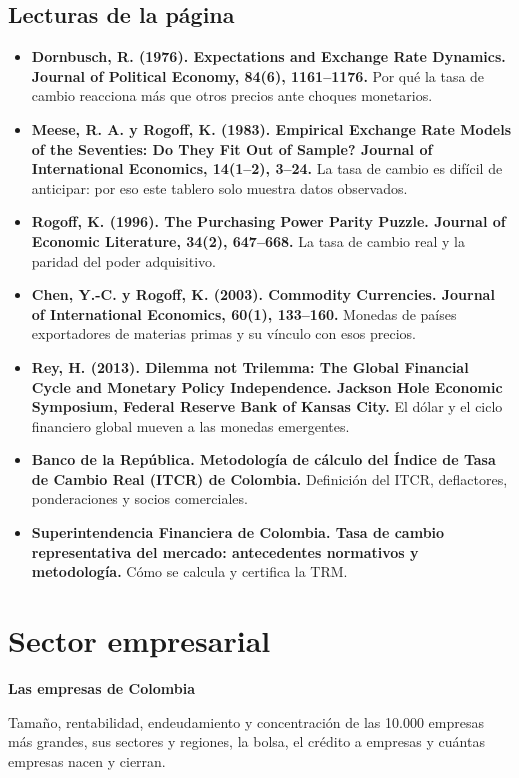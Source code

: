 \section*{Lecturas de la página}
\begin{itemize}\small
\item \textbf{Dornbusch, R. (1976). Expectations and Exchange Rate Dynamics. Journal of Political Economy, 84(6), 1161–1176.} Por qué la tasa de cambio reacciona más que otros precios ante choques monetarios.
\item \textbf{Meese, R. A. y Rogoff, K. (1983). Empirical Exchange Rate Models of the Seventies: Do They Fit Out of Sample? Journal of International Economics, 14(1–2), 3–24.} La tasa de cambio es difícil de anticipar: por eso este tablero solo muestra datos observados.
\item \textbf{Rogoff, K. (1996). The Purchasing Power Parity Puzzle. Journal of Economic Literature, 34(2), 647–668.} La tasa de cambio real y la paridad del poder adquisitivo.
\item \textbf{Chen, Y.-C. y Rogoff, K. (2003). Commodity Currencies. Journal of International Economics, 60(1), 133–160.} Monedas de países exportadores de materias primas y su vínculo con esos precios.
\item \textbf{Rey, H. (2013). Dilemma not Trilemma: The Global Financial Cycle and Monetary Policy Independence. Jackson Hole Economic Symposium, Federal Reserve Bank of Kansas City.} El dólar y el ciclo financiero global mueven a las monedas emergentes.
\item \textbf{Banco de la República. Metodología de cálculo del Índice de Tasa de Cambio Real (ITCR) de Colombia.} Definición del ITCR, deflactores, ponderaciones y socios comerciales.
\item \textbf{Superintendencia Financiera de Colombia. Tasa de cambio representativa del mercado: antecedentes normativos y metodología.} Cómo se calcula y certifica la TRM.
\end{itemize}

\chapter{Sector empresarial}
\label{atlas:empresas}

{\large\sffamily\bfseries Las empresas de Colombia\par}\medskip

Tamaño, rentabilidad, endeudamiento y concentración de las 10.000 empresas más grandes, sus sectores y regiones, la bolsa, el crédito a empresas y cuántas empresas nacen y cierran.

